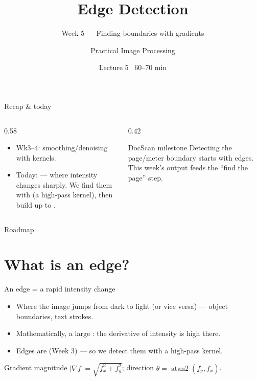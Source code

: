 \documentclass[10pt,aspectratio=169]{beamer}
\title{Edge Detection}
\subtitle{Week 5 — Finding boundaries with gradients}
\author{Practical Image Processing}
\date{Lecture 5 \textbullet\ 60--70 min}
\begin{document}
\maketitle

\begin{frame}{Recap \& today}
  \begin{columns}[T]
    \begin{column}{0.58\textwidth}
      \begin{itemize}
        \item Wk3--4: smoothing/denoising with kernels.
        \item \alert{Today:}  — where intensity changes sharply. We find them with
               (a high-pass kernel), then build up to .
      \end{itemize}
    \end{column}
    \begin{column}{0.42\textwidth}
      \begin{alertblock}{DocScan milestone}
        Detecting the page/meter boundary starts with edges. This week's output feeds the
        ``find the page'' step.
      \end{alertblock}
    \end{column}
  \end{columns}
\end{frame}

\begin{frame}{Roadmap}\tableofcontents\end{frame}

\section{What is an edge?}

\begin{frame}{An edge = a rapid intensity change}
  \begin{itemize}
    \item Where the image jumps from dark to light (or vice versa) — object boundaries, text strokes.
    \item Mathematically, a large : the derivative of intensity is high there.
    \item Edges are  (Week 3) — so we detect them with a high-pass kernel.
  \end{itemize}
  \begin{mathbox}
    Gradient magnitude $|\nabla f| = \sqrt{f_x^2 + f_y^2}$; direction $\theta=\operatorname{atan2}(f_y,f_x)$.
  \end{mathbox}
\end{frame}
\end{document}
